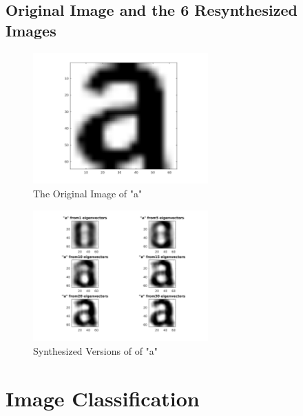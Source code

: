 \documentclass{article}
\begin{document}
	\subsection{Original Image and the 6 Resynthesized Images}
		\begin{figure}[h]
			\begin{center}
				\includegraphics[width=0.6\textwidth]{orgA.png}
				\caption{The Original Image of "a"}
			\end{center}
		\end{figure}

\pagebreak

		\begin{figure}[h]
			\begin{center}
				\includegraphics[width=0.6\textwidth]{synA.png}
				\caption{Synthesized Versions of of "a"}
			\end{center}
		\end{figure}


\section{Image Classification}
\end{document}
